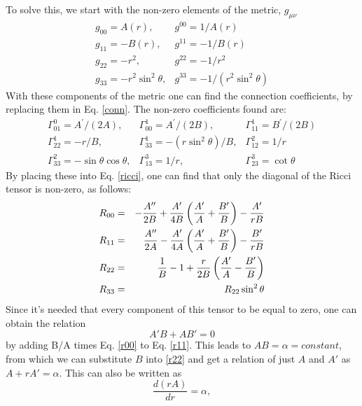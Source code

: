 \documentclass[letterpaper,11pt,onecolumn]{article}
\begin{document}
To solve this, we start with the non-zero elements of the metric, $g_{\mu\nu}$
  $$
\begin{array}{ll}
g_{00}=A(r), & g^{00}=1 / A(r) \\
g_{11}=-B(r), & g^{11}=-1 / B(r) \\
g_{22}=-r^{2}, & g^{22}=-1 / r^{2} \\
g_{33}=-r^{2} \sin ^{2} \theta, & g^{33}=-1 /\left(r^{2} \sin ^{2} \theta\right)
\end{array}
$$
With these components of the metric one can find the connection coefficients, by replacing them in Eq. \ref{conn}. The non-zero coefficients found are: 
$$
\begin{array}{lll}
\Gamma_{01}^{0}=A^{\prime} /(2 A), & \Gamma_{00}^{1}=A^{\prime} /(2 B), & \Gamma_{11}^{1}=B^{\prime} /(2 B) \\
\Gamma_{22}^{1}=-r / B, & \Gamma_{33}^{1}=-\left(r \sin ^{2} \theta\right) / B, & \Gamma_{12}^{2}=1 / r \\
\Gamma_{33}^{2}=-\sin \theta \cos \theta, & \Gamma_{13}^{3}=1 / r, & \Gamma_{23}^{3}=\cot \theta
\end{array}
$$
By placing these into Eq. \ref{ricci}, one can find that only the diagonal of the Ricci tensor is non-zero, as follows:
\begin{eqnarray}
\centering
R_{00}&=&-\frac{A^{\prime \prime}}{2 B}+\frac{A^{\prime}}{4 B}\left(\frac{A^{\prime}}{A}+\frac{B^{\prime}}{B}\right)-\frac{A^{\prime}}{r B} \label{r00}\\
R_{11}&=&\frac{A^{\prime \prime}}{2 A}-\frac{A^{\prime}}{4 A}\left(\frac{A^{\prime}}{A}+\frac{B^{\prime}}{B}\right)-\frac{B^{\prime}}{r B} \label{r11}\\
R_{22}&=&\frac{1}{B}-1+\frac{r}{2 B}\left(\frac{A^{\prime}}{A}-\frac{B^{\prime}}{B}\right)\label{r22} \\
R_{33}&=&R_{22} \sin ^{2} \theta\label{r33}
\end{eqnarray}
 Since it's needed that every component of this tensor to be equal to zero, one can obtain the relation
 \begin{equation}
     A'B+AB'=0\nonumber
 \end{equation}
 by adding B/A times Eq. \ref{r00} to Eq. \ref{r11}. This leads to $AB=\alpha=constant$, from which we can substitute $B$ into \ref{r22} and get a relation of just $A$ and $A'$ as $A+rA'=\alpha$. This can also be written as
 \begin{equation}
\frac{d(r A)}{d r}=\alpha, \nonumber
\end{equation}
\end{document}

